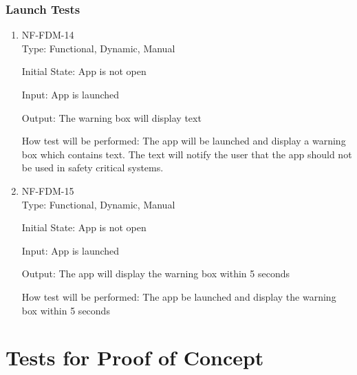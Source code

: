 \documentclass[12pt, titlepage]{article}
\begin{document}
\subsubsection{Launch Tests}
\begin{enumerate}
\item{NF-FDM-14\\}
Type: Functional, Dynamic, Manual
					
Initial State: 
App is not open
					
Input: 
App is launched
					
Output: 
The warning box will display text
					
How test will be performed: 
The app will be launched and display a warning box which contains text. The text will notify the user that the app should not be used in safety critical systems.

\item{NF-FDM-15\\}
Type: Functional, Dynamic, Manual
					
Initial State: 
App is not open
					
Input: 
App is launched
					
Output: 
The app will display the warning box within 5 seconds
					
How test will be performed: 
The app be launched and display the warning box within 5 seconds


\end{enumerate}




\section{Tests for Proof of Concept}
\end{document}
